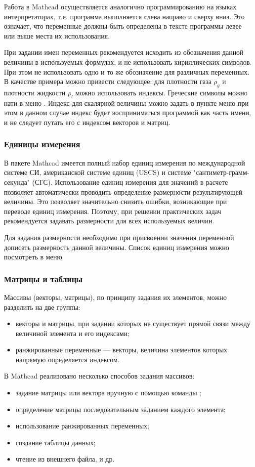 Работа в Mathcad осуществляется аналогично программированию на языках интерпретаторах, т.е. программа выполняется слева направо и сверху вниз. Это означает, что переменные должны быть определены в тексте программы левее или выше места их использования.

При задании имен переменных рекомендуется исходить из обозначения данной величины в используемых формулах, и не использовать кириллических символов. При этом не использовать одно и то же обозначение для различных переменных. В качестве примера можно привести следующее: для плотности газа $\rho_g$ и плотности жидкости $\rho_l$ можно использовать индексы. Греческие символы можно нати в меню  . Индекс для скалярной величины можно задать в пункте меню  при этом в данном случае индекс будет восприниматься программой как часть имени, и не следует путать его с индексом векторов и матриц.


\subsubsection*{Единицы измерения}
В пакете Mathcad имеется полный набор единиц измерения по международной системе СИ,  американской системе единиц  (USCS) и системе "сантиметр-грамм-секунда" (СГС). Использование единиц измерения для значений в расчете позволяет автоматически проводить определение размерности результирующей величины. Это позволяет значительно снизить ошибки, возникающие при переводе единиц измерения. Поэтому, при решении практических задач рекомендуется задавать размерности для всех используемых величин.

Для задания размерности необходимо при присвоении значения переменной дописать размерность данной величины. Список единиц измерения можно посмотреть в меню  

\subsubsection*{Матрицы и таблицы}
Массивы (векторы, матрицы), по принципу задания их элементов, можно разделить на две группы:
\begin{itemize}
\item векторы и матрицы, при задании которых не существует прямой связи между величиной элемента и его индексами;
\item ранжированные переменные --- векторы, величина элементов которых напрямую определяется индексом.
\end{itemize}
В Mathcad реализовано несколько способов задания массивов:
\begin{itemize}
	\item задание матрицы или вектора вручную с помощью команды ;
	\item определение матрицы последовательным заданием каждого элемента;
	\item использование ранжированных переменных;
	\item создание таблицы данных;
	\item чтение из внешнего файла, и др.
\end{itemize}

